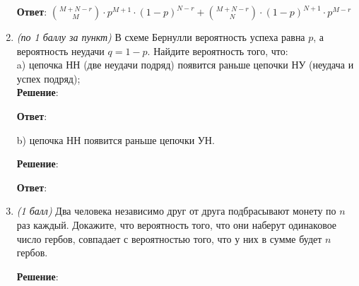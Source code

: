 \documentclass{article}
\begin{document}
\begin{enumerate}
    \textbf{Ответ}:
    $\binom{M+N-r}{M} \cdot p^{M+1} \cdot (1-p)^{N-r} + \binom{M+N-r}{N} \cdot (1-p)^{N+1} \cdot p^{M-r}$
    
    \item \textit{(по 1 баллу за пункт)}  В схеме Бернулли вероятность успеха равна $p$, а вероятность неудачи $q = 1-p$. Найдите вероятность того, что:\\
    a) цепочка НН (две неудачи подряд) появится раньше цепочки НУ (неудача и успех подряд);\\

    \textbf{Решение}:





    \textbf{Ответ}:

    b) цепочка НН появится раньше цепочки УН.

    \textbf{Решение}:





    \textbf{Ответ}:
    
    \item \textit{(1 балл)} Два человека независимо друг от друга подбрасывают монету по $n$ раз каждый. Докажите, что вероятность того, что они наберут одинаковое число гербов, совпадает с вероятностью того, что у них в сумме будет $n$ гербов.
    

    \textbf{Решение}:


\end{enumerate}
\end{document}
